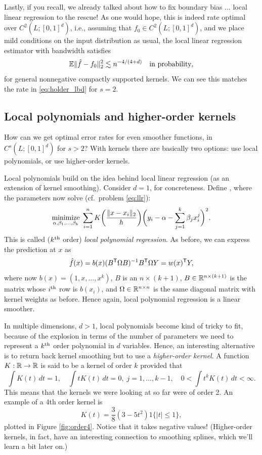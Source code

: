 \documentclass{article}
\begin{document}
Lastly, if you recall, we already talked about how to fix boundary bias ... 
local linear regression to the rescue! As one would hope, this is indeed rate
optimal over $C^2(L; [0,1]^d)$, i.e., assuming that $f_0 \in C^2(L; [0,1]^d)$,
and we place mild conditions on the input distribution as usual, the local
linear regression estimator with bandwidth  
satisfies      
\begin{equation}
\label{eq:kernel_rate}
\mathbb{E}\|\hat{f} - f_0\|_2^2 \lesssim n^{-4/(4+d)} \quad \text{in probability},
\end{equation}
for general nonnegative compactly supported kernels. We can see this matches the
rate in \eqref{eq:holder_lbd} for $s=2$.

\subsection{Local polynomials and higher-order kernels}

How can we get optimal error rates for even smoother functions, in $C^s(L;
[0,1]^d)$ for $s > 2$? With kernels there are basically two options: use
local polynomials, or use higher-order kernels.

Local polynomials build on the idea behind local linear regression (as an
extension of kernel smoothing). Consider $d=1$, for concreteness. Define
, where the
parameters  now solve 
(cf.\ problem \eqref{eq:llr}):
\begin{equation}
\label{eq:local_poly}
\mathop{\mathrm{minimize}}_{\alpha, \beta_1,\dots,\beta_k} \; \sum_{i=1}^n K\bigg(
\frac{\|x-x_i\|_2}{h} \bigg) \bigg(y_i - \alpha - \sum_{j=1}^k \beta_j x_i^j 
\bigg)^2. 
\end{equation}
This is called ($k^{\text{th}}$ order) \emph{local polynomial regression}. As before, we 
can express the prediction at $x$ as
\[
\hat{f}(x) = b(x)(B^{\mathsf{T}} \Omega B)^{-1} B^{\mathsf{T}} \Omega Y = w(x)^{\mathsf{T}} Y,
\]
where now $b(x) = (1,x,\dots,x^k)$, $B$ is an $n \times (k+1)$, $B \in \mathbb{R}^{n 
  \times (k+1)}$ is the matrix whose $i^{\text{th}}$ row is $b(x_i)$, and $\Omega \in
\mathbb{R}^{n \times n}$ is the same diagonal matrix with kernel weights as
before. Hence again, local polynomial regression is a linear smoother. 

In multiple dimensions, $d>1$, local polynomials become kind of tricky to fit,
because of the explosion in terms of the number of parameters we need to
represent a $k^{\text{th}}$ order polynomial in $d$ variables. Hence, an interesting
alternative is to return back kernel smoothing but to use a \emph{higher-order
  kernel}. A function $K : \mathbb{R} \to \mathbb{R}$ is said to be a kernel of order $k$ 
provided that 
\[ 
\int K(t) \, dt = 1, \quad
\int t K(t) \, dt = 0, \; j=1,\dots,k-1, \quad
0 < \int t^k K(t) \, dt < \infty.
\]
This means that the kernels we were looking at so far were of order 2. An
example of a 4th order kernel is  
\[
K(t) = \frac{3}{8}(3-5t^2) 1\{|t|\leq 1\}, 
\]
plotted in Figure \ref{fig:order4}. Notice that it takes negative values!
(Higher-order kernels, in fact, have an interesting connection to smoothing 
splines, which we'll learn a bit later on.)
\end{document}
